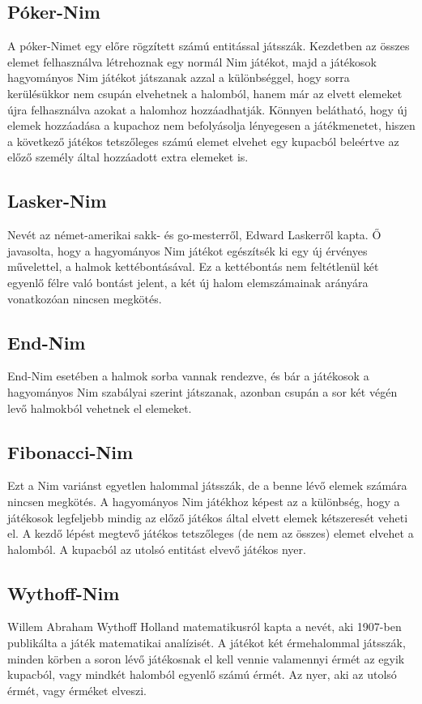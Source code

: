 \subsection{Póker-Nim}
A póker-Nimet egy előre rögzített számú entitással játsszák. Kezdetben az összes elemet felhasználva létrehoznak egy normál Nim játékot, majd a játékosok hagyományos Nim játékot játszanak azzal a különbséggel, hogy sorra kerülésükkor nem csupán elvehetnek a halomból, hanem már az elvett elemeket újra felhasználva azokat a halomhoz hozzáadhatják. \ujsor
Könnyen belátható, hogy új elemek hozzáadása a kupachoz nem befolyásolja lényegesen a játékmenetet, hiszen a következő játékos tetszőleges számú elemet elvehet egy kupacból beleértve az előző személy által hozzáadott extra elemeket is.

\subsection{Lasker-Nim}
Nevét az német-amerikai sakk- és go-mesterről, Edward Laskerről kapta. Ő javasolta, hogy a hagyományos Nim játékot egészítsék ki egy új érvényes művelettel, a halmok kettébontásával. Ez a kettébontás nem feltétlenül két egyenlő félre való bontást jelent, a két új halom elemszámainak arányára vonatkozóan nincsen megkötés.

\subsection{End-Nim}
End-Nim esetében a halmok sorba vannak rendezve, és bár a játékosok a hagyományos Nim szabályai szerint játszanak, azonban csupán a sor két végén levő halmokból vehetnek el elemeket.

\subsection{Fibonacci-Nim}
Ezt a Nim variánst egyetlen halommal játsszák, de a benne lévő elemek számára nincsen megkötés. A hagyományos Nim játékhoz képest az a különbség, hogy a játékosok legfeljebb mindig az előző játékos által elvett elemek kétszeresét veheti el. A kezdő lépést megtevő játékos tetszőleges (de nem az összes) elemet elvehet a halomból. A kupacból az utolsó entitást elvevő játékos nyer.

\subsection{Wythoff-Nim}
Willem Abraham Wythoff Holland matematikusról kapta a nevét, aki 1907-ben publikálta a játék matematikai analízisét. A játékot két érmehalommal játsszák, minden körben a soron lévő játékosnak el kell vennie valamennyi érmét az egyik kupacból, vagy mindkét halomból egyenlő számú érmét. Az nyer, aki az utolsó érmét, vagy érméket elveszi. \ujsor

